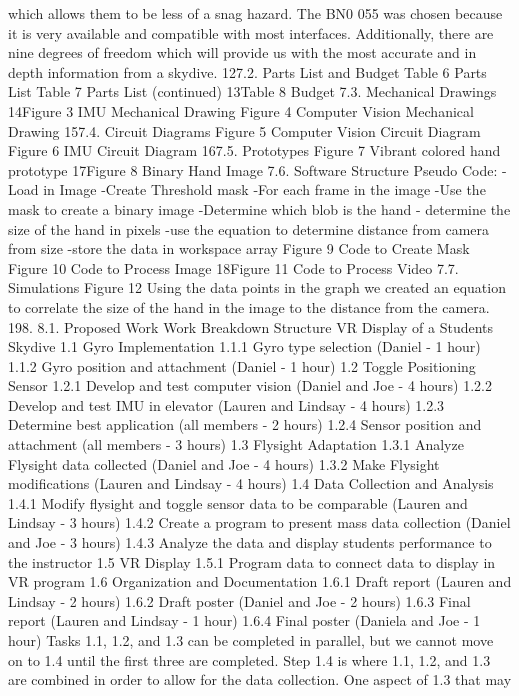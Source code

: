 which allows them to be less of a snag hazard.
The BN0 055 was chosen because it is very available and compatible with most interfaces. Additionally, there are nine
degrees of freedom which will provide us with the most accurate and in depth information from a skydive.
127.2.
Parts List and Budget
Table 6 Parts List
Table 7 Parts List (continued)
13Table 8 Budget
7.3.
Mechanical Drawings
14Figure 3 IMU Mechanical Drawing
Figure 4 Computer Vision Mechanical Drawing
157.4.
Circuit Diagrams
Figure 5 Computer Vision Circuit Diagram
Figure 6 IMU Circuit Diagram
167.5.
Prototypes
Figure 7 Vibrant colored hand prototype
17Figure 8 Binary Hand Image
7.6.
Software Structure
Pseudo Code:
-Load in Image
-Create Threshold mask
-For each frame in the image
-Use the mask to create a binary image
-Determine which blob is the hand
- determine the size of the hand in pixels
-use the equation to determine distance from camera from size
-store the data in workspace array
Figure 9 Code to Create Mask
Figure 10 Code to Process Image
18Figure 11 Code to Process Video
7.7.
Simulations
Figure 12 Using the data points in the graph we created an equation to correlate the size of the hand in the image to the distance from the
camera.
198.
8.1.
Proposed Work
Work Breakdown Structure
VR Display of a Students Skydive
1.1 Gyro Implementation
1.1.1 Gyro type selection (Daniel - 1 hour)
1.1.2 Gyro position and attachment (Daniel - 1 hour)
1.2 Toggle Positioning Sensor
1.2.1 Develop and test computer vision (Daniel and Joe - 4 hours)
1.2.2 Develop and test IMU in elevator (Lauren and Lindsay - 4 hours)
1.2.3 Determine best application (all members - 2 hours)
1.2.4 Sensor position and attachment (all members - 3 hours)
1.3 Flysight Adaptation
1.3.1 Analyze Flysight data collected (Daniel and Joe - 4 hours)
1.3.2 Make Flysight modifications (Lauren and Lindsay - 4 hours)
1.4 Data Collection and Analysis
1.4.1 Modify flysight and toggle sensor data to be comparable
(Lauren and Lindsay - 3 hours)
1.4.2 Create a program to present mass data collection
(Daniel and Joe - 3 hours)
1.4.3 Analyze the data and display students performance to the instructor
1.5 VR Display
1.5.1 Program data to connect data to display in VR program
1.6 Organization and Documentation
1.6.1 Draft report (Lauren and Lindsay - 2 hours)
1.6.2 Draft poster (Daniel and Joe - 2 hours)
1.6.3 Final report (Lauren and Lindsay - 1 hour)
1.6.4 Final poster (Daniela and Joe - 1 hour)
Tasks 1.1, 1.2, and 1.3 can be completed in parallel, but we cannot move on to 1.4 until the first three are completed.
Step 1.4 is where 1.1, 1.2, and 1.3 are combined in order to allow for the data collection. One aspect of 1.3 that may
